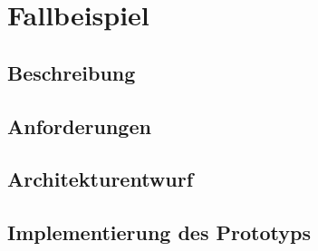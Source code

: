 \chapter{Fallbeispiel}

\section{Beschreibung}
\section{Anforderungen}
\section{Architekturentwurf}
\section{Implementierung des Prototyps}

